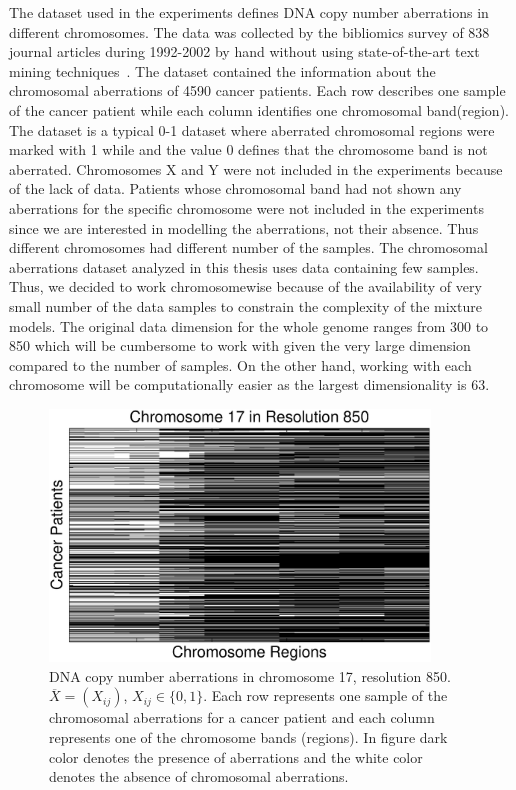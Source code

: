 The dataset used in the experiments defines DNA copy number aberrations in different chromosomes. The data was collected by the bibliomics survey of 838 journal articles during 1992-2002 by hand without using state-of-the-art text mining techniques~\cite{Myllykangas200815, Holl20071}. The dataset contained the information about the chromosomal aberrations of 4590 cancer patients. Each row describes one sample of the cancer patient while each column identifies one chromosomal band(region). The dataset is a typical \mbox{0-1} dataset where aberrated chromosomal regions were marked with 1 while and the value 0 defines that the chromosome band is not aberrated.  Chromosomes X and Y were not included in the experiments because of the lack of data. Patients whose chromosomal band had not shown any aberrations for the specific chromosome were not included in the experiments since we are interested in modelling the aberrations, not their absence. Thus different chromosomes had different number of the samples. The chromosomal aberrations dataset analyzed in this thesis uses data containing few samples. Thus, we decided to work chromosomewise because of the availability of very small number of the data samples to constrain the complexity of the mixture models. The original data dimension for the whole genome ranges from 300 to 850 which will be cumbersome to work with given the very large dimension compared to the number of samples. On the other hand, working with each chromosome will be computationally easier as the largest dimensionality is 63.


\begin{figure}[h!]
\centering
\includegraphics[width=0.9\textwidth]{figures/chr17dm850data}
\caption[Aberrations in chromosome 17 in resolution 850]{DNA copy number aberrations in chromosome 17, resolution 850. $\overline{X}=(X_{ij})$, $X_{ij}\in \{0,1\}$. Each row represents one sample of the chromosomal aberrations for a cancer patient and each column represents one of the chromosome bands (regions).  In figure dark color denotes the presence of aberrations and the white color denotes the absence of chromosomal aberrations.} \label{Fig:data850}
\end{figure}


